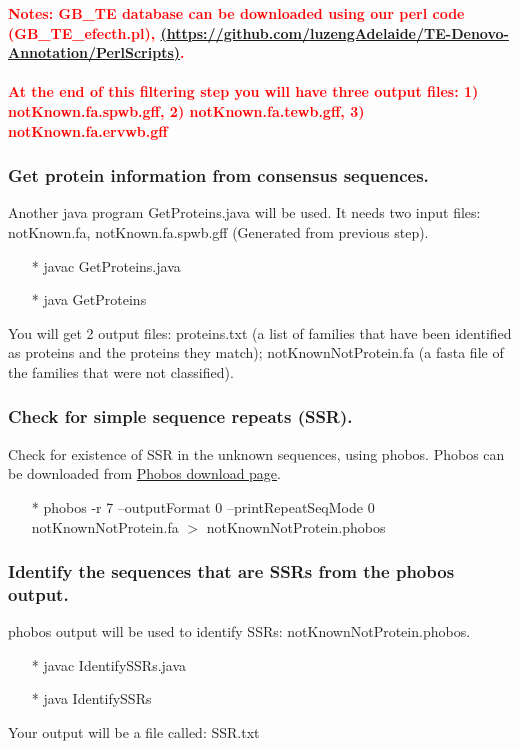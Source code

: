 \documentclass[12pt]{report}
\begin{document}
\noindent\textbf{\textcolor{red}{Notes: GB\_TE database can be downloaded using our perl code (GB\_TE\_efecth.pl), \href{<url>}(\url{https://github.com/luzengAdelaide/TE-Denovo-Annotation/PerlScripts)}. \\
		\\
At the end of this filtering step you will have three output files: 1) notKnown.fa.spwb.gff, 2) notKnown.fa.tewb.gff, 3) notKnown.fa.ervwb.gff}} 

\subsubsection*{Get protein information from consensus sequences.}
Another java program GetProteins.java will be used. It needs two input files: notKnown.fa, notKnown.fa.spwb.gff (Generated from previous step).
\begin{enumerate}
	\item[*] javac GetProteins.java
	\item[*] java GetProteins
\end{enumerate}
You will get 2 output files: proteins.txt (a list of families that have been identified as proteins and the proteins they match);
notKnownNotProtein.fa (a fasta file of the families that were not classified).

\subsubsection*{Check for simple sequence repeats (SSR).}
Check for existence of SSR in the unknown sequences, using phobos. Phobos can be downloaded from \href{http://www.ruhr-uni-bochum.de/ecoevo/cm/cm_phobos.htm} {\color{blue} Phobos download page}.
\begin{enumerate}
	\item[*] phobos -r 7 --outputFormat 0 --printRepeatSeqMode 0 notKnownNotProtein.fa $>$ notKnownNotProtein.phobos
\end{enumerate}

\subsubsection*{Identify the sequences that are SSRs from the phobos output.}
phobos output will be used to identify SSRs: notKnownNotProtein.phobos.
\begin{enumerate}
	\item[*] javac IdentifySSRs.java
	\item[*] java IdentifySSRs
\end{enumerate}
Your output will be a file called: SSR.txt
\end{document}
